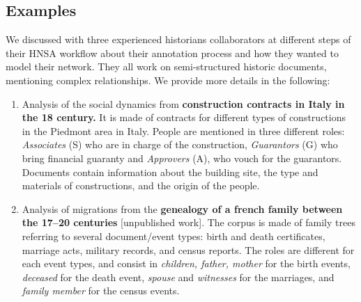 \iffalse
\subsection{Examples}\label{sec:examples}

We discussed with three experienced historians collaborators at different steps of their HNSA workflow about
their annotation process and how they wanted to model their network. They all work on semi-structured historic documents, mentioning complex relationships. We provide more details in the following:

\newcommand{\pascal}{\#1}
\newcommand{\nicole}{\#2}
\newcommand{\zacarias}{\#3}
\newcommand{\dana}{\#4}
\newcommand{\myindent}{~~} %
\begin{enumerate}[nosep,leftmargin=*]
    \item Analysis of the social dynamics from \textbf{construction contracts in Italy in the 18 century\cite{Cristofoli2018, Rolla2018}.}
    It is made of contracts for different types of constructions in the Piedmont area in Italy. People are mentioned in three different roles: \textit{Associates} (S) who are in charge of the construction, \textit{Guarantors} (G) who bring financial guaranty and \textit{Approvers} (A), who vouch for the guarantors. Documents contain information about the building site, the type and materials of constructions, and the origin of the people.
    \item Analysis of migrations from the \textbf{genealogy of a french family between the 17--20 centuries} [unpublished work].
    The corpus is made of family trees referring to several document/event types: birth and death certificates, marriage acts, military records, and census reports. The roles are different for each event types, and consist in \textit{children, father, mother} for the birth events, \textit{deceased} for the death event, \textit{spouse} and \textit{witnesses} for the marriages, and \textit{family member} for the census events.

\end{enumerate}
